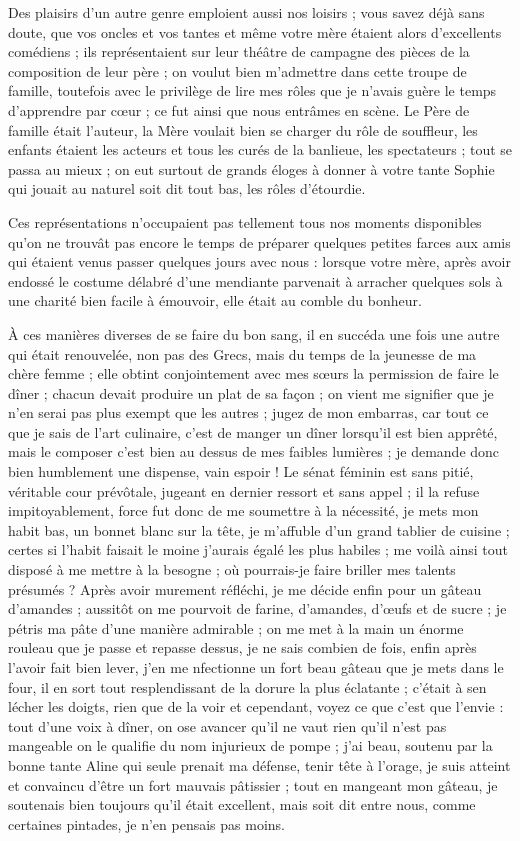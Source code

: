 \documentclass[11pt,a4paper]{report}
\begin{document}
Des plaisirs d'un autre genre emploient aussi nos loisirs ; vous savez déjà sans doute, que vos oncles et vos tantes et même votre mère étaient alors d'excellents comédiens ; ils représentaient sur leur théâtre de campagne des pièces de la composition de leur père ; on voulut bien m'admettre dans cette troupe de famille, toutefois avec le privilège de lire mes rôles que je n'avais guère le temps d'apprendre par cœur ; ce fut ainsi que nous entrâmes en scène. Le Père de famille était l'auteur, la Mère voulait bien se charger du rôle de souffleur, les enfants étaient les acteurs et tous les curés de la banlieue, les spectateurs ; tout se passa au mieux ; on eut surtout de grands éloges à donner à votre tante Sophie qui jouait au naturel soit dit tout bas, les rôles d'étourdie.

Ces représentations n'occupaient pas tellement tous nos moments disponibles qu'on ne trouvât pas encore le temps de préparer quelques petites farces aux amis qui étaient venus passer quelques jours avec nous : lorsque votre mère, après avoir endossé le costume délabré d'une mendiante parvenait à arracher quelques sols à une charité bien facile à émouvoir, elle était au comble du bonheur.

À ces manières diverses de se faire du bon sang, il en succéda une fois une autre qui était renouvelée, non pas des Grecs, mais du temps de la jeunesse de ma chère femme ; elle obtint conjointement avec mes sœurs la permission de faire le dîner ; chacun devait produire un plat de sa façon ; on vient me signifier que je n'en serai pas plus exempt que les autres ; jugez de mon embarras, car tout ce que je sais de l'art culinaire, c'est de manger un dîner lorsqu'il est bien apprêté, mais le composer c'est bien au dessus de mes faibles lumières ; je demande donc bien humblement une dispense, vain espoir ! Le sénat féminin est sans pitié, véritable cour prévôtale, jugeant en dernier ressort et sans appel ; il la refuse impitoyablement, force fut donc de me soumettre à la nécessité, je mets mon habit bas, un bonnet blanc sur la tête, je m'affuble d'un grand tablier de cuisine ; certes si l'habit faisait le moine j'aurais égalé les plus habiles ; me voilà ainsi tout disposé à me mettre à la besogne ; où pourrais-je faire briller mes talents présumés ? Après avoir murement réfléchi, je me décide enfin pour un gâteau d'amandes ; aussitôt on me pourvoit de farine, d'amandes, d'œufs et de sucre ; je pétris ma pâte d'une manière admirable ; on me met à la main un énorme rouleau que je passe et repasse dessus, je ne sais combien de fois, enfin après l'avoir fait bien lever, j'en me nfectionne un fort beau gâteau que je mets dans le four, il en sort tout resplendissant de la dorure la plus éclatante ; c'était à sen lécher les doigts, rien que de la voir et cependant, voyez ce que c'est que l'envie : tout d'une voix à dîner, on ose avancer qu'il ne vaut rien qu'il n'est pas mangeable on le qualifie du nom injurieux de pompe ; j'ai beau, soutenu par la bonne tante Aline qui seule prenait ma défense, tenir tête à l'orage, je suis atteint et convaincu d'être un fort mauvais pâtissier ; tout en mangeant mon gâteau, je soutenais bien toujours qu'il était excellent, mais soit dit entre nous, comme certaines pintades, je n'en pensais pas moins.
\end{document}
